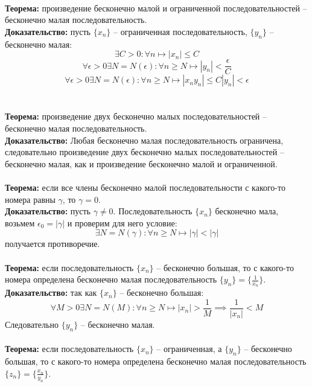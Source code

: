 \documentclass{article}
\begin{document}
        \\
        \textbf{Теорема:} произведение бесконечно малой и ограниченной последовательностей -- бесконечно малая последовательность.
        \\
        \textbf{Доказательство:}
        пусть $\{x_n\}$ -- ограниченная последовательность, $\{y_n\}$ -- бесконечно малая:
        \[ \exists C > 0: \forall n \longmapsto |x_n| \le C \]
        \[ \forall \epsilon > 0 \exists N = N(\epsilon): \forall n \ge N \longmapsto |y_n| < \frac{\epsilon}{C} \]
        \[ \forall \epsilon > 0 \exists N = N(\epsilon): \forall n \ge N \longmapsto |x_ny_n| \le C|y_n| < \epsilon \]
        \\
        \\
        \textbf{Теорема:} произведение двух бесконечно малых последовательностей -- бесконечно малая последовательность.
        \\
        \textbf{Доказательство:}
        Любая бесконечно малая последовательность ограничена, следовательно произведение двух бесконечно малых последовательностей -- бесконечно
        малая, как и произведение бесконечно малой и ограниченной.
        \\
        \\
        \textbf{Теорема:} если все члены бесконечно малой последовательности с какого-то номера равны $\gamma$, то $\gamma = 0$.
        \\
        \textbf{Доказательство:}
        пусть $\gamma \neq 0$. Последовательность $\{x_n\}$ бесконечно мала, возьмем $\epsilon_0 = |\gamma|$ и проверим для него условие:
        \[ \exists N = N(\gamma): \forall n \ge N \longmapsto |\gamma| < |\gamma| \]
        получается противоречие.
        \\
        \\
        \textbf{Теорема:} если последовательность $\{x_n\}$ -- бесконечно большая, то с какого-то номера определена бесконечно малая последовательность $\{y_n\} = \{\frac{1}{x_n}\}$.
        \\
        \textbf{Доказательство:}
        так как $\{x_n\}$ -- бесконечно большая:
        \[ \forall M > 0 \exists N = N(M): \forall n \ge N \longmapsto |x_n| > \frac{1}{M} \implies \frac{1}{|x_n|} < {M}\]
        Следовательно $\{y_n\}$ -- бесконечно малая.
        \\
        \\
        \textbf{Теорема:} если последовательность $\{x_n\}$ -- ограниченная, а $\{y_n\}$ -- бесконечно большая,
        то с какого-то номера определена бесконечно малая последовательность $\{z_n\} = \{\frac{x_n}{y_n}\}$.
\end{document}
